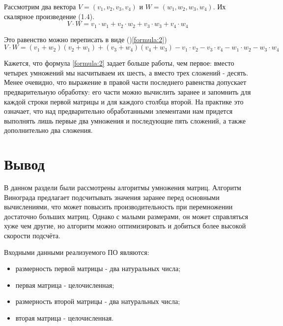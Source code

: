 \documentclass[12pt,a4paper]{report}
\begin{document}
Рассмотрим два вектора $V = (v_{1}, v_{2}, v_{3}, v_{4})$ и $W = (w_{1}, w_{2}, w_{3}, w_{4})$. Их 
скалярное произведение (1.4). 
\begin{equation}
    V \cdot W = v_{1} \cdot w_{1} + v_{2} \cdot w_{2} + v_{3} \cdot w_{3} + v_{4} \cdot w_{4}
    \label{formula:1}
\end{equation}

Это равенство можно переписать в виде ()\ref{formula:2})
\begin{equation}
    V \cdot W = (v_{1} + w_{2})(v_{2} + w_{1}) + (v_{3} + w_{4})(v_{4} + w_{3}) - v_{1} \cdot v_{2} - v_{3} \cdot v_{4} - w_{1} \cdot w_{2} - w_{3} \cdot w_{4}
    \label{formula:2}    
\end{equation}

Кажется, что формула \ref{formula:2} задает больше работы, чем первое: вместо четырех умножений мы насчитываем их 
шесть, а вместо трех сложений - десять.
Менее очевидно, что выражение в правой части последнего равенства допускает предварительную обработку: его 
части можно вычислить заранее и запомнить для каждой строки первой матрицы и для каждого столбца второй. 
На практике это означает, что над предварительно обработанными элементами нам придется выполнять лишь первые 
два умножения и последующие пять сложений, а также дополнительно два сложения.

\section*{Вывод}

В данном раздели были рассмотрены алгоритмы умножения матриц.
Алгоритм Винограда предлагает подсчитывать значения заранее перед основными вычислениями, что может повысить 
производительность при перемножении достаточно больших матриц. 
Однако с малыми размерами, он может справляться хуже чем другие, но алгоритм можно оптимизировать и добиться 
более высокой скорости подсчёта.


Входными данными реализуемого ПО являются:

\begin{itemize}
	\item размерность первой матрицы - два натуральных числа;
	\item первая матрица - целочисленная;
	\item размерность второй матрицы - два натуральных числа;
	\item вторая матрица - целочисленная.
\end{itemize}
\end{document}
